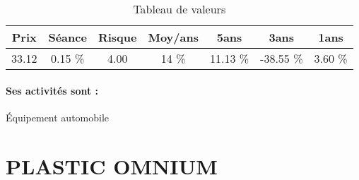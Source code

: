 \documentclass[11pt,a4paper]{report}%
\begin{document}
\begin{table}[H]
  \centering
    \begin{tabular}{|c|c|c|c|c|c|c|}
    \hline
    Prix & Séance & Risque  & Moy/ans & 5ans & 3ans & 1ans \\
    \hline
    33.12 &    0.15 \%    & 4.00 & 14 \% & 11.13 \% & -38.55 \% & 3.60 \% \\
    \hline
    \end{tabular}%
        \label{tab:table_VALEO}%
      \caption{Tableau de valeurs}
\end{table}%

\paragraph{Ses activités sont : } Équipement automobile 
    
    \newpage

\section{PLASTIC OMNIUM}
\end{document}
